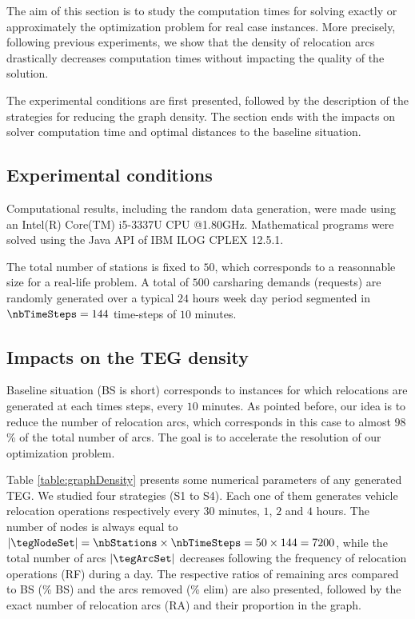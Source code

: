 \begin{bibunit}[ieeetr]
\bigskip
The aim of this section is to study the computation times for solving exactly or approximately the optimization problem for real case instances.
More precisely, following previous experiments, we show that the density of relocation arcs drastically decreases computation times without impacting the quality of the solution.

\bigskip
The experimental conditions are first presented, followed by the description of the strategies for reducing the graph density.
The section ends with the impacts on solver computation time and optimal distances to the baseline situation. 

\subsection{Experimental conditions}
Computational results, including the random data generation, were made using an Intel(R) Core(TM) i5-3337U CPU @1.80GHz.
Mathematical programs were solved using the Java API of IBM ILOG CPLEX 12.5.1.

\bigskip
The total number of stations is fixed to $50$, which corresponds to a reasonnable size for a real-life problem.
A total of $500$ carsharing demands (requests) are randomly generated over a typical $24$ hours week day period segmented in $\nbTimeSteps = 144$ time-steps of $10$ minutes.

\subsection{Impacts on the TEG density}
Baseline situation (BS is short) corresponds to instances for which relocations are generated at each times steps, \ie every $10$ minutes.
As pointed before, our idea is to reduce the number of relocation arcs, which corresponds in this case to almost $98$\% of the total number of arcs.
The goal is to accelerate the resolution of our optimization problem.

\bigskip
Table \ref{table:graphDensity} presents some numerical parameters of any generated TEG.
We studied four strategies (S1 to S4).
Each one of them generates vehicle relocation operations respectively every $30$ minutes, $1$, $2$ and $4$ hours. 
The number of nodes is always equal to $|\tegNodeSet| = \nbStations \times \nbTimeSteps = 50 \times 144 = 7200$, while the total number of arcs $|\tegArcSet|$ decreases following the frequency of relocation operations (RF) during a day.
The respective ratios of remaining arcs compared to BS (\% BS) and the arcs removed (\% elim) are also presented, followed by the exact number of relocation arcs (RA) and their proportion in the graph.


\end{bibunit}
